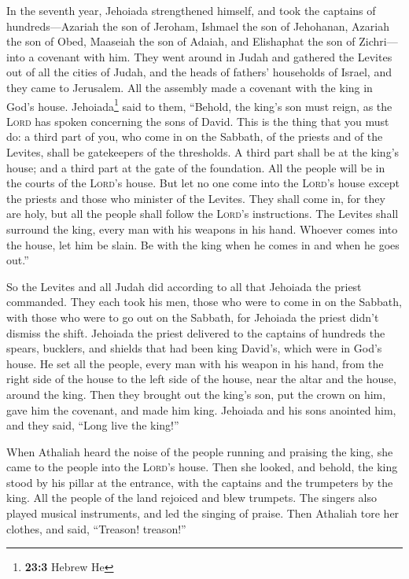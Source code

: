  In the seventh year, Jehoiada strengthened himself, and
took the captains of hundreds---Azariah the son of Jeroham, Ishmael the
son of Jehohanan, Azariah the son of Obed, Maaseiah the son of Adaiah,
and Elishaphat the son of Zichri---into a covenant with him.
 They went around in Judah and gathered the Levites out of
all the cities of Judah, and the heads of fathers' households of Israel,
and they came to Jerusalem.  All the assembly made a
covenant with the king in God's house. Jehoiada\footnote{\textbf{23:3}
  Hebrew He} said to them, ``Behold, the king's son must reign, as the
\textsc{Lord} has spoken concerning the sons of David. 
This is the thing that you must do: a third part of you, who come in on
the Sabbath, of the priests and of the Levites, shall be gatekeepers of
the thresholds.  A third part shall be at the king's
house; and a third part at the gate of the foundation. All the people
will be in the courts of the \textsc{Lord}'s house.  But
let no one come into the \textsc{Lord}'s house except the priests and
those who minister of the Levites. They shall come in, for they are
holy, but all the people shall follow the \textsc{Lord}'s instructions.
 The Levites shall surround the king, every man with his
weapons in his hand. Whoever comes into the house, let him be slain. Be
with the king when he comes in and when he goes out.''

 So the Levites and all Judah did according to all that
Jehoiada the priest commanded. They each took his men, those who were to
come in on the Sabbath, with those who were to go out on the Sabbath,
for Jehoiada the priest didn't dismiss the shift. 
Jehoiada the priest delivered to the captains of hundreds the spears,
bucklers, and shields that had been king David's, which were in God's
house.  He set all the people, every man with his weapon
in his hand, from the right side of the house to the left side of the
house, near the altar and the house, around the king. 
Then they brought out the king's son, put the crown on him, gave him the
covenant, and made him king. Jehoiada and his sons anointed him, and
they said, ``Long live the king!''

 When Athaliah heard the noise of the people running and
praising the king, she came to the people into the \textsc{Lord}'s
house.  Then she looked, and behold, the king stood by
his pillar at the entrance, with the captains and the trumpeters by the
king. All the people of the land rejoiced and blew trumpets. The singers
also played musical instruments, and led the singing of praise. Then
Athaliah tore her clothes, and said, ``Treason! treason!''


